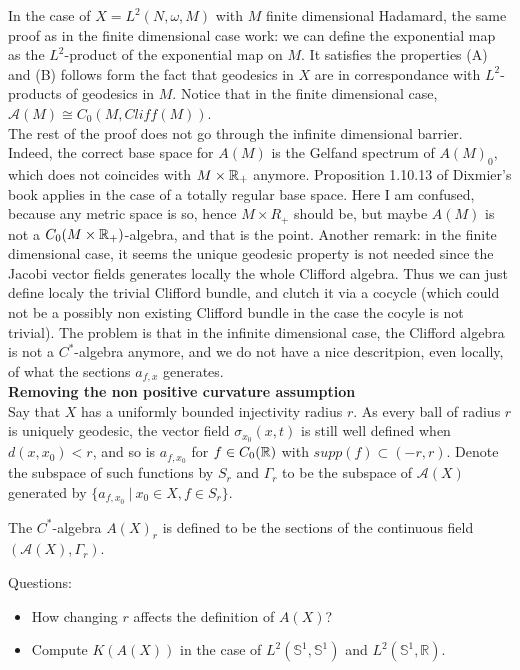 In the case of $X=L^2(N,\omega,M)$ with $M$ finite dimensional Hadamard, the same proof as in the finite dimensional case work: we can define the exponential map as the $L^2$-product of the exponential map on $M$. It satisfies the properties (A) and (B) follows form the fact that geodesics in $X$ are in correspondance with $L^2$-products of geodesics in $M$. Notice that in the finite dimensional case, $\mathcal A(M)\cong C_0(M,Cliff(M))$.\\

The rest of the proof does not go through the infinite dimensional barrier. Indeed, the correct base space for $A(M)$ is the Gelfand spectrum of $A(M)_0$, which does not coincides with $M\times \mathbb R_+$ anymore. Proposition 1.10.13 of Dixmier's book applies in the case of a totally regular base space. Here I am confused, because any metric space is so, hence $M\times R_+$ should be, but maybe $A(M)$ is not a $C_0(M\times \mathbb R_+ )$-algebra, and that is the point. Another remark: in the finite dimensional case, it seems the unique geodesic property is not needed since the Jacobi vector fields generates locally the whole Clifford algebra. Thus we can just define localy the trivial Clifford bundle, and clutch it via a cocycle (which could not be a possibly non existing Clifford bundle in the case the cocyle is not trivial). The problem is that in the infinite dimensional case, the Clifford algebra is not a $C^*$-algebra anymore, and we do not have a nice descritpion, even locally, of what the sections $a_{f,x}$ generates.\\ 

\textbf{Removing the non positive curvature assumption}\\

Say that $X$ has a uniformly bounded injectivity radius $r$. As every ball of radius $r$ is uniquely geodesic, the vector field $\sigma_{x_0}(x,t)$ is still well defined when $d(x,x_0)<r$, and so is $a_{f,x_0}$ for $f\in C_0(\mathbb R)$ with $supp(f)\subset (-r,r)$. Denote the subspace of such functions by $S_r$ and $\Gamma_r$ to be the subspace of $\mathcal A(X)$ generated by $\{a_{f,x_0} \ | \ x_0\in X, f\in S_r \}$.

\begin{definition}
The $C^*$-algebra $A(X)_r$ is defined to be the sections of the continuous field $(\mathcal A(X), \Gamma_r)$.
\end{definition}

Questions:
\begin{itemize}
\item How changing $r$ affects the definition of $A(X)$?
\item Compute $K(A(X))$ in the case of $L^2(\mathbb S^1, \mathbb S^1)$ and $L^2(\mathbb S^1, \mathbb R)$. 
\end{itemize}

